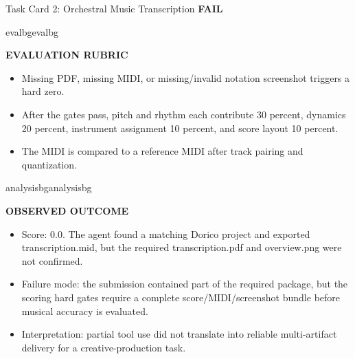 \documentclass{llmxive}
\providecommand{\StatusBadge}[3]{\begingroup\setlength{\fboxsep}{3pt}\colorbox{#2}{\textbf{#1}}\endgroup}
\providecommand{\BlockTitle}[1]{{\raggedright\textbf{\footnotesize #1}\par}\vspace{2pt}}
\begin{document}
\begin{ColorTaskCard}{Task Card 2: Orchestral Music Transcription \hfill \StatusBadge{FAIL}{failbg}{failred}}
\begin{minipage}[t]{0.49\linewidth}
\end{minipage}\hfill
\begin{minipage}[t]{0.49\linewidth}
\vspace{0pt}
\begin{CardBlock}{evalbg}{evalbg}
\BlockTitle{EVALUATION RUBRIC}
\begin{itemize}
\item Missing PDF, missing MIDI, or missing/invalid notation screenshot triggers a hard zero.
\item After the gates pass, pitch and rhythm each contribute 30 percent, dynamics 20 percent, instrument assignment 10 percent, and score layout 10 percent.
\item The MIDI is compared to a reference MIDI after track pairing and quantization.
\end{itemize}
\end{CardBlock}

\begin{CardBlock}{analysisbg}{analysisbg}
\BlockTitle{OBSERVED OUTCOME}
\begin{itemize}
\item Score: 0.0. The agent found a matching Dorico project and exported transcription.mid, but the required transcription.pdf and overview.png were not confirmed.
\item Failure mode: the submission contained part of the required package, but the scoring hard gates require a complete score/MIDI/screenshot bundle before musical accuracy is evaluated.
\item Interpretation: partial tool use did not translate into reliable multi-artifact delivery for a creative-production task.
\end{itemize}
\end{CardBlock}
\end{minipage}
\end{ColorTaskCard}
\end{document}
